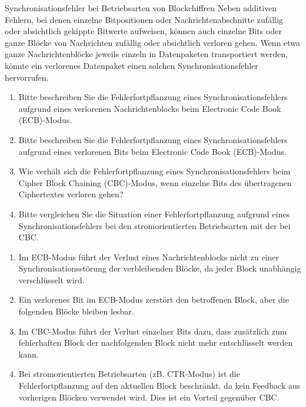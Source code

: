 \documentclass{article}
\begin{document}
\begin{exercise}{Synchronisationsfehler bei Betriebsarten von Blockchiffren}
  Neben additiven Fehlern, bei denen einzelne Bitpositionen oder Nachrichtenabschnitte zufällig oder absichtlich gekippte Bitwerte aufweisen, können auch einzelne Bits oder ganze Blöcke von Nachrichten zufällig oder absichtlich verloren gehen. Wenn etwa ganze Nachrichtenblöcke jeweils einzeln in Datenpaketen transportiert werden, könnte ein verlorenes Datenpaket einen solchen Synchronisationsfehler hervorrufen.
  \begin{enumerate}
    \item Bitte beschreiben Sie die Fehlerfortpflanzung eines Synchronisationsfehlers aufgrund eines verlorenen Nachrichtenblocks beim Electronic Code Book (ECB)-Modus.
    \item Bitte beschreiben Sie die Fehlerfortpflanzung eines Synchronisationsfehlers aufgrund eines verlorenen Bits beim Electronic Code Book (ECB)-Modus.
    \item Wie verhält sich die Fehlerfortpflanzung eines Synchronisationsfehlers beim Cipher Block Chaining (CBC)-Modus, wenn einzelne Bits des übertragenen Ciphertextes verloren gehen?
    \item Bitte vergleichen Sie die Situation einer Fehlerfortpflanzung aufgrund eines Synchronisationsfehlers bei den stromorientierten Betriebsarten mit der bei CBC.
  \end{enumerate}

  \begin{solution}
    \begin{enumerate}
        \item Im ECB-Modus führt der Verlust eines Nachrichtenblocks nicht zu einer Synchronisationsstörung der verbleibenden Blöcke, da jeder Block unabhängig verschlüsselt wird.
        \item Ein verlorenes Bit im ECB-Modus zerstört den betroffenen Block, aber die folgenden Blöcke bleiben lesbar.
        \item Im CBC-Modus führt der Verlust einzelner Bits dazu, dass zusätzlich zum fehlerhaften Block der nachfolgenden Block nicht mehr entschlüsselt werden kann.
        \item Bei stromorientierten Betriebsarten (zB. CTR-Modus) ist die Fehlerfortpflanzung auf den aktuellen Block beschränkt, da kein Feedback aus vorherigen Blöcken verwendet wird. Dies ist ein Vorteil gegenüber CBC.
    \end{enumerate}
  \end{solution}
\end{exercise}
\end{document}
